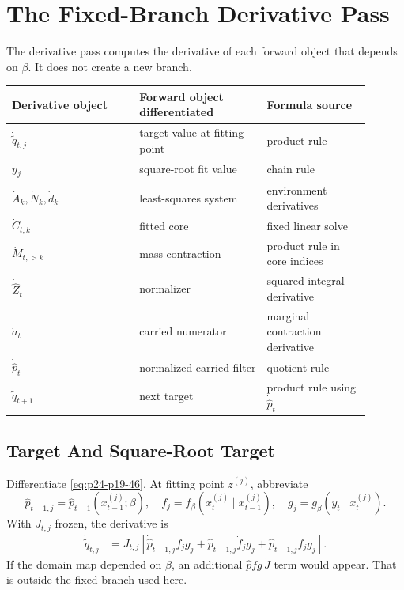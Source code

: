 \documentclass[11pt]{article}
\begin{document}
\section{The Fixed-Branch Derivative Pass}

The derivative pass computes the derivative of each forward object that depends
on \(\beta\).  It does not create a new branch.

\begin{center}
\begin{tabular}{p{0.32\linewidth}p{0.32\linewidth}p{0.26\linewidth}}
\toprule
Derivative object & Forward object differentiated & Formula source\\
\midrule
\(\dot{\widetilde q}_{t,j}\) & target value at fitting point & product rule\\
\(\dot y_j\) & square-root fit value & chain rule\\
\(\dot A_k,\dot N_k,\dot d_k\) & least-squares system & environment derivatives\\
\(\dot C_{t,k}\) & fitted core & fixed linear solve\\
\(\dot M_{t,>k}\) & mass contraction & product rule in core indices\\
\(\dot{\widehat Z}_t\) & normalizer & squared-integral derivative\\
\(\dot a_t\) & carried numerator & marginal contraction derivative\\
\(\dot{\widehat p}_t\) & normalized carried filter & quotient rule\\
\(\dot{\widetilde q}_{t+1}\) & next target & product rule using \(\dot{\widehat p}_t\)\\
\bottomrule
\end{tabular}
\end{center}

\subsection{Target And Square-Root Target}

Differentiate \eqref{eq:p24-p19-46}.  At fitting point \(z^{(j)}\), abbreviate
\[
    \widehat p_{t-1,j}=\widehat p_{t-1}(x_{t-1}^{(j)};\beta),
    \quad
    f_j=f_\beta(x_t^{(j)}\mid x_{t-1}^{(j)}),
    \quad
    g_j=g_\beta(y_t\mid x_t^{(j)}).
    \label{eq:p24-p19-51}
\]
With \(J_{t,j}\) frozen, the derivative is
\[
\begin{aligned}
    \dot{\widetilde q}_{t,j}
    &=
    J_{t,j}
    \left[
    \dot{\widehat p}_{t-1,j} f_j g_j
    +
    \widehat p_{t-1,j}\dot f_j g_j
    +
    \widehat p_{t-1,j} f_j\dot g_j
    \right].
\end{aligned}
\label{eq:p24-p19-52}
\]
If the domain map depended on \(\beta\), an additional
\(\widehat p f g\,\dot J\) term would appear.  That is outside the fixed branch
used here.
\end{document}
